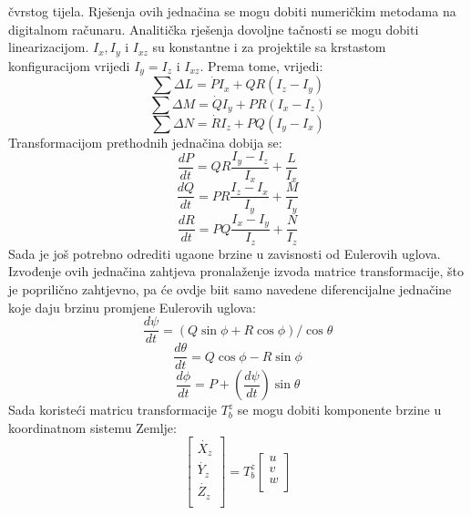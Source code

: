 čvrstog tijela. Rješenja ovih jednačina se mogu dobiti numeričkim metodama na digitalnom 
računaru. Analitička rješenja dovoljne tačnosti se mogu dobiti linearizacijom. $I_x,I_y$ i $I_{xz}$ su konstantne 
i za projektile sa krstastom konfiguracijom vrijedi $I_y=I_z$ i $I_{xz}$. Prema tome, vrijedi:
\begin{equation}
    \sum \Delta L=\dot{P}I_x+QR(I_z-I_y)
\end{equation}
\begin{equation}
    \sum \Delta M=\dot{Q}I_y+PR(I_x-I_z)
\end{equation}
\begin{equation}
    \sum \Delta N=\dot{R}I_z+PQ(I_y-I_x)
\end{equation}
Transformacijom prethodnih jednačina dobija se:
\begin{equation}
    \frac{dP}{dt}=QR\frac{I_y-I_z}{I_x}+\frac{L}{I_x}
    \label{eq:q1}
\end{equation}
\begin{equation}
    \frac{dQ}{dt}=PR\frac{I_z-I_x}{I_y}+\frac{M}{I_y}
    \label{eq:q2}
\end{equation}
\begin{equation}
    \frac{dR}{dt}=PQ\frac{I_x-I_y}{I_z}+\frac{N}{I_z}
    \label{eq:q3}
\end{equation}
Sada je još potrebno odrediti ugaone brzine u zavisnosti od Eulerovih uglova. Izvođenje ovih jednačina zahtjeva 
pronalaženje izvoda matrice transformacije, što je poprilično zahtjevno, pa će ovdje biit samo navedene 
diferencijalne jednačine koje daju brzinu promjene Eulerovih uglova:
\begin{equation}
    \frac{d\psi}{dt}=(Q\sin\phi +R\cos\phi)/\cos\theta
    \label{eq:w1}
\end{equation}
\begin{equation}
    \frac{d\theta}{dt}=Q\cos\phi-R\sin\phi
    \label{eq:w2}
\end{equation}
\begin{equation}
    \frac{d\phi}{dt}=P+\left( \frac{d\psi}{dt} \right)\sin\theta
    \label{eq:w3}
\end{equation}
Sada koristeći matricu transformacije $T_b^z$ se mogu dobiti komponente
brzine u koordinatnom sistemu Zemlje:
\begin{equation}
    \begin{bmatrix}
        \dot{X_z}\\
        \dot{Y_z}\\   
        \dot{Z_z}\\
    \end{bmatrix}=T_b^z\begin{bmatrix}
        u\\
        v\\   
        w\\
    \end{bmatrix}
    \label{eq:q}
\end{equation}

